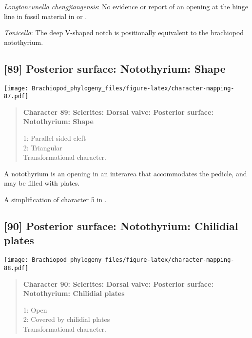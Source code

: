 \documentclass[openany]{book}
\theoremstyle{definition}
\theoremstyle{definition}
\theoremstyle{definition}
\theoremstyle{remark}
\begin{document}
\hypertarget{Longtancunella_chengjiangensis-coding-88}{}
\emph{Longtancunella chengjiangensis}: No evidence or report of an
opening at the hinge line in fossil material in
\citet{Zhang2007Agregarious} or \citet{Zhang2011Theexceptionally}.

\hypertarget{Tonicella-coding-88}{}
\emph{Tonicella}: The deep V-shaped notch \citep[fig. 8]{Schwabe2010} is
positionally equivalent to the brachiopod notothyrium.

\subsection*{{[}89{]} Posterior surface: Notothyrium:
Shape}\label{posterior-surface-notothyrium-shape}

\texttt{[image: Brachiopod\_phylogeny\_files/figure-latex/character-mapping-87.pdf]}

\begin{quote}
\textbf{Character 89: Sclerites: Dorsal valve: Posterior surface:
Notothyrium: Shape}

1: Parallel-sided cleft\\
2: Triangular\\
Transformational character.
\end{quote}

A notothyrium is an opening in an interarea that accommodates the
pedicle, and may be filled with plates.

A simplification of character 5 in
\citet{Bassett2001Functionalmorphology}.

\subsection*{{[}90{]} Posterior surface: Notothyrium: Chilidial
plates}\label{posterior-surface-notothyrium-chilidial-plates}

\texttt{[image: Brachiopod\_phylogeny\_files/figure-latex/character-mapping-88.pdf]}

\begin{quote}
\textbf{Character 90: Sclerites: Dorsal valve: Posterior surface:
Notothyrium: Chilidial plates}

1: Open\\
2: Covered by chilidial plates\\
Transformational character.
\end{quote}
\end{document}
